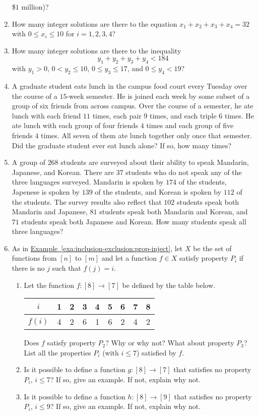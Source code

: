\begin{enumerate}
  \$$1$ million)?
\item How many integer solutions are there to the equation $x_1 + x_2
  + x_3 + x_4 = 32$
  with $0\leq x_i\leq 10$ for $i=1,2,3,4$?
\item How many integer solutions are there to the inequality
  \[y_1 + y_2 + y_3 + y_4 < 184\]
  with $y_1>0$, $0<y_2\leq 10$, $0\leq y_3\leq 17$, and $0\leq y_4 <
  19$?
\item A graduate student eats lunch in the campus food court every
  Tuesday over the course of a $15$-week semester. He is joined each
  week by some subset of a group of six friends from across
  campus. Over the course of a semester, he ate lunch with each friend
  $11$ times, each pair $9$ times, and each triple $6$ times. He ate
  lunch with each group of four friends $4$ times and each group of
  five friends $4$ times. All seven of them ate lunch together only
  once that semester. Did the graduate student ever eat lunch alone?
  If so, how many times?
\item A group of $268$ students are surveyed about their ability to
  speak Mandarin, Japanese, and Korean. There are $37$ students who do
  not speak any of the three languages surveyed. Mandarin is spoken by
  $174$ of the students, Japenese is spoken by $139$ of the students,
  and Korean is spoken by $112$ of the students. The survey results
  also reflect that $102$ students speak both Mandarin and Japanese,
  $81$ students speak both Mandarin and Korean, and $71$ students
  speak both Japanese and Korean. How many students speak all three
  languages?
\item As in
  \hyperref[exa:inclusion-exclusion:prop-inject]{Example~\ref*{exa:inclusion-exclusion:prop-inject}},
  let $X$ be the set of functions from $[n]$ to $[m]$ and let a
  function $f\in X$ satisfy property $P_i$ if there is no $j$ such
  that $f(j)=i$.
  \begin{enumerate}
  \item Let the function $f\colon [8]\to [7]$ be defined by the table
    below.
    \begin{center}
      \begin{tabular}{c|c|c|c|c|c|c|c|c}
        $i$ & 1 & 2 & 3 & 4 & 5 & 6 & 7 & 8\\\hline
        $f(i)$ & 4 & 2 & 6 & 1 & 6 & 2 & 4 & 2
      \end{tabular}
    \end{center}
    Does $f$ satisfy property $P_2$? Why or why not? What about
    property $P_3$? List all the properties $P_i$ (with $i\leq 7$)
    satisfied by $f$.
  \item Is it possible to define a function $g\colon [8]\to [7]$ that
    satisfies no property $P_i$, $i\leq 7$? If so, give an example. If
    not, explain why not.
  \item Is it possible to define a function $h\colon [8]\to [9]$ that
    satisfies no property $P_i$, $i\leq 9$? If so, give an example. If
    not, explain why not.
  \end{enumerate}


\end{enumerate}
